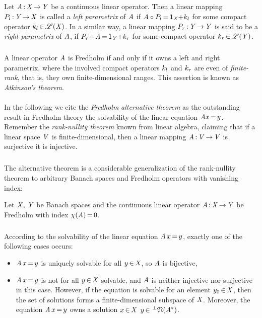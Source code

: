 \documentclass[11pt,twoside]{article}
\begin{document}
\subparagraph{}
Let $\mathit{A} {\,:\,} \mathit{X} {\,\to\,} \mathit{Y}$ be a continuous linear operator.
Then a linear mapping $P_l {\,:\,} \mathit{Y} {\,\to\,} \mathit{X}$
is called a \textit{left parametrix} of $\mathit{A}$
if $\mathit{A} \circ P_l {\,=\,} {\mathsf{1}}_{\mathit{X}} {+} k_l$
for some compact operator $k_l {\,\in\,} \mathscr{L}(\mathit{X})$.
In a similar way,
a linear mapping $P_r {\,:\,} \mathit{Y} {\,\to\,} \mathit{Y}$
is said to be a \textit{right parametrix} of $\mathit{A}$,
if $P_r \circ \mathit{A} {\,=\,} {\mathsf{1}}_{\mathit{Y}} {+} k_r$
for some compact operator $k_r {\,\in\,} \mathscr{L}(\mathit{Y})$.

\subparagraph{} %
A linear operator $\mathit{A}$ is Fredholm if and only if
it owns a left and right parametrix,
where the involved compact operators $k_l$ and $k_r$
are even of \textit{finite-rank},
that is,
they own finite-dimensional ranges.
This assertion is known as \textit{Atkinson's theorem}.

\paragraph{} %
In the following we cite the \textit{Fredholm} \textit{alternative theorem}
as the outstanding result in Fredholm theory
{\wrt} the solvability of the linear equation $\mathit{A} x {\,=\,} y$.
Remember the \textit{rank-nullity theorem} known from linear algebra,
claiming that if a linear space $\mathit{V}$ is finite-dimensional,
then a linear mapping $\mathit{A} {\,:\,} \mathit{V} {\,\to\,} \mathit{V}$ is surjective
\iff it is injective.

\subparagraph{}
The alternative theorem is a considerable generalization
of the rank-nullity theorem to arbitrary Banach spaces and Fredholm operators
with vanishing index:

\begin{theorem}\label{FREDHOLM_ALTERNATIVE_THEOREM}
Let $\mathit{X},\,\mathit{Y}$ be Banach spaces and
the continuous linear operator $\mathit{A} {\,:\,} \mathit{X} {\,\to\,} \mathit{Y}$ be Fredholm
with index $\chi(\mathit{A}) {\,=\,} 0$.

\subparagraph{}
According to the solvability of the linear equation $\mathit{A} \, x {\,=\,} y$,
exactly one of the following cases occurs:

\begin{itemize}[leftmargin=9mm]
\item[(a)]
$\mathit{A} \, x {\,=\,} y$ is uniquely solvable for all $y {\,\in\,} \mathit{X}$,
so $\mathit{A}$ is bijective,

\item[(b)]
$\mathit{A} \, x {\,=\,} y$ is not for all $y {\,\in\,} \mathit{X}$ solvable,
and $\mathit{A}$ is neither injective nor surjective in this case.
However,
if the equation is solvable for an element $y_0 {\,\in\,} \mathit{X}$,
then the set of solutions forms a finite-dimensional subspace of $\mathit{X}$.
Moreover,
the equation $\mathit{A} \, x {\,=\,} y$ owns a solution $x {\,\in\,} \mathit{X}$
\iff
$y {\,\in\,} \,^{\bot}\mathfrak{N}(\mathit{A}^*)$.
\end{itemize}
\end{theorem}
\end{document}
